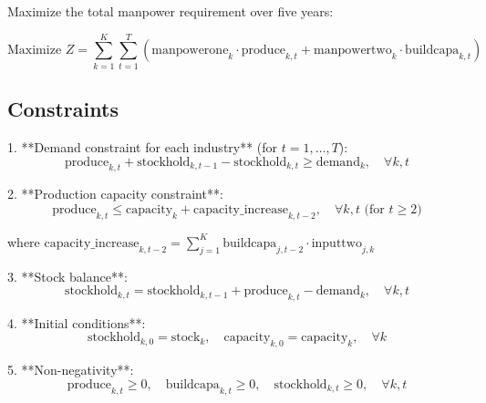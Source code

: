 \documentclass{article}
\begin{document}
Maximize the total manpower requirement over five years:

\[
\text{Maximize } Z = \sum_{k=1}^{K} \sum_{t=1}^{T} \left( \text{manpowerone}_{k} \cdot \text{produce}_{k,t} + \text{manpowertwo}_{k} \cdot \text{buildcapa}_{k,t} \right)
\]

\subsection*{Constraints}

1. **Demand constraint for each industry** (for \( t = 1, \ldots, T \)):
   \[
   \text{produce}_{k,t} + \text{stockhold}_{k,t-1} - \text{stockhold}_{k,t} \geq \text{demand}_{k}, \quad \forall k, t
   \]

2. **Production capacity constraint**:
   \[
   \text{produce}_{k,t} \leq \text{capacity}_{k} + \text{capacity\_increase}_{k,t-2}, \quad \forall k, t \text{ (for } t \geq 2\text{)}
   \]
   
   where \( \text{capacity\_increase}_{k,t-2} = \sum_{j=1}^{K} \text{buildcapa}_{j,t-2} \cdot \text{inputtwo}_{j,k} \)

3. **Stock balance**:
   \[
   \text{stockhold}_{k,t} = \text{stockhold}_{k,t-1} + \text{produce}_{k,t} - \text{demand}_{k}, \quad \forall k, t
   \]

4. **Initial conditions**:
   \[
   \text{stockhold}_{k,0} = \text{stock}_{k}, \quad \text{capacity}_{k,0} = \text{capacity}_{k}, \quad \forall k
   \]

5. **Non-negativity**:
   \[
   \text{produce}_{k,t} \geq 0, \quad \text{buildcapa}_{k,t} \geq 0, \quad \text{stockhold}_{k,t} \geq 0, \quad \forall k, t
   \]
\end{document}
